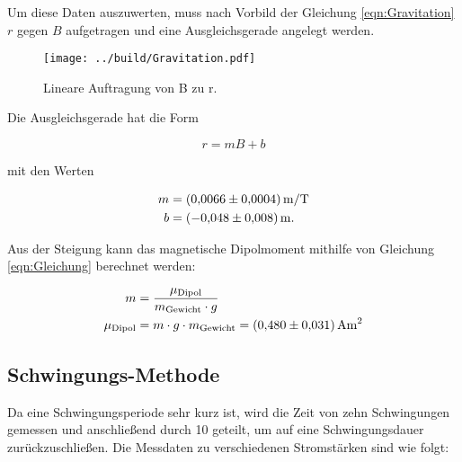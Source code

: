 \noindent Um diese Daten auszuwerten, muss nach Vorbild der Gleichung \eqref{eqn:Gravitation} $r$ gegen $B$ aufgetragen und eine 
Ausgleichsgerade angelegt werden.

\begin{figure}
    \texttt{[image: ../build/Gravitation.pdf]}
    \caption{Lineare Auftragung von B zu r.}  
\end{figure}

\noindent Die Ausgleichsgerade hat die Form 

\begin{equation}
    r = m B + b
\end{equation}

\noindent mit den Werten

\begin{align*}
    m &= \qty{0.0066 \pm 0.0004}{\unit{\meter \per \tesla}} \\
    b &= \qty{-0.048 \pm 0.008}{\unit{\meter}}.
\end{align*}

\noindent Aus der Steigung kann das magnetische Dipolmoment mithilfe von Gleichung \eqref{eqn:Gleichung} 
berechnet werden:

\begin{align}
    m &= \frac{\mu_\text{Dipol}}{m_\text{Gewicht} \cdot g} \\
    \mu_\text{Dipol} &= m \cdot g \cdot m_\text{Gewicht} = \qty{0.480 \pm 0.031}{\unit{\ampere \meter \squared}} 
\end{align}


\subsection{Schwingungs-Methode}

Da eine Schwingungsperiode sehr kurz ist, wird die Zeit von zehn Schwingungen gemessen und anschließend durch 10 geteilt, 
um auf eine Schwingungsdauer zurückzuschließen. Die Messdaten zu verschiedenen Stromstärken sind wie folgt: 

